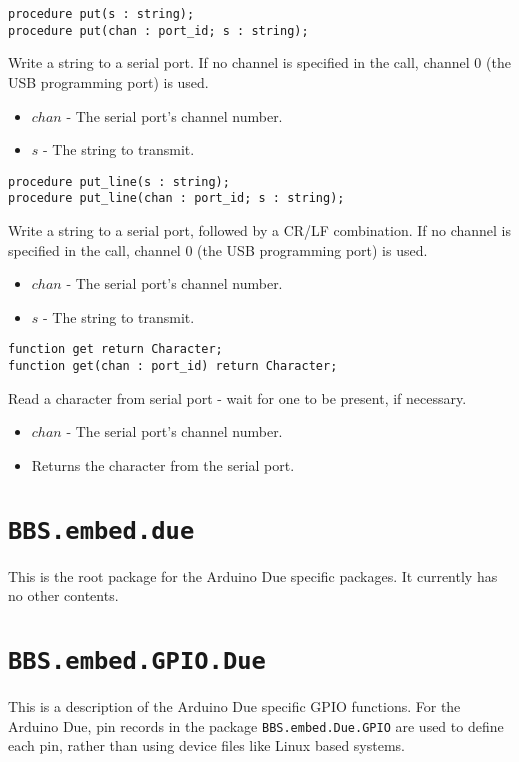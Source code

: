\documentclass[10pt, openany]{book}
\newcommand{\indexfunc}[1]{\index[func]{#1}}
\newcommand{\package}[1]{\texttt{#1}}
\begin{document}
\begin{lstlisting}
procedure put(s : string);
procedure put(chan : port_id; s : string);
\end{lstlisting}
\indexfunc{put}
Write a string to a serial port.  If no channel is specified in the call, channel 0 (the USB programming port) is used.
\begin{itemize}
  \item $chan$ - The serial port's channel number.
  \item $s$ - The string to transmit.
\end{itemize}

\begin{lstlisting}
procedure put_line(s : string);
procedure put_line(chan : port_id; s : string);
\end{lstlisting}
\indexfunc{put\_line}
Write a string to a serial port, followed by a CR/LF combination.  If no channel is specified in the call, channel 0 (the USB programming port) is used.
\begin{itemize}
  \item $chan$ - The serial port's channel number.
  \item $s$ - The string to transmit.
\end{itemize}

\begin{lstlisting}
function get return Character;
function get(chan : port_id) return Character;
\end{lstlisting}
\indexfunc{get}
Read a character from serial port - wait for one to be present, if necessary.
\begin{itemize}
  \item $chan$ - The serial port's channel number.
  \item Returns the character from the serial port.
\end{itemize}

\section{\package{BBS.embed.due}}
This is the root package for the Arduino Due specific packages.  It currently has no other contents.

\section{\package{BBS.embed.GPIO.Due}}
This is a description of the Arduino Due specific GPIO functions.  For the Arduino Due, pin records in the package \package{BBS.embed.Due.GPIO} are used to define each pin, rather than using device files like Linux based systems.
\end{document}

